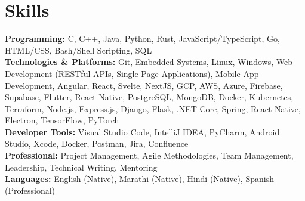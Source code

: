 \documentclass[letterpaper,12pt]{article}
\newcommand{\resumeSubHeadingListStart}{\begin{itemize}[leftmargin=0.15in, label={}]}
\newcommand{\resumeSubHeadingListEnd}{\end{itemize}}
\begin{document}

\section{Skills}
\vspace{2pt}
\resumeSubHeadingListStart
\small{\item{
\textbf{Programming:} C, C++, Java, Python, Rust, JavaScript/TypeScript, Go, HTML/CSS, Bash/Shell Scripting, SQL \\ \vspace{3pt}
\textbf{Technologies \& Platforms:} Git, Embedded Systems, Linux, Windows, Web Development (RESTful APIs, Single Page Applications), Mobile App Development, Angular, React, Svelte, NextJS, GCP, AWS, Azure, Firebase, Supabase, Flutter, React Native, PostgreSQL, MongoDB, Docker, Kubernetes, Terraform, Node.js, Express.js, Django, Flask, .NET Core, Spring, React Native, Electron, TensorFlow, PyTorch \\ \vspace{3pt}
\textbf{Developer Tools:} Visual Studio Code, IntelliJ IDEA, PyCharm, Android Studio, Xcode, Docker, Postman, Jira, Confluence \\ \vspace{3pt}
\textbf{Professional:} Project Management, Agile Methodologies, Team Management, Leadership, Technical Writing, Mentoring \\ \vspace{3pt}
\textbf{Languages:} English (Native), Marathi (Native), Hindi (Native), Spanish (Professional)
}}
\resumeSubHeadingListEnd
\end{document}

